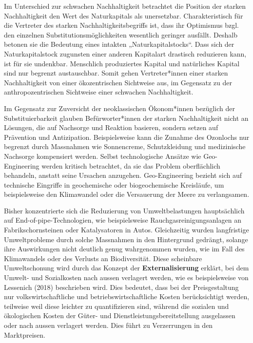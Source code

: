 \documentclass[
  nswissgerman,
  a4paper,
  DIV=11,
  numbers=noendperiod,
  oneside,
  openany]{scrreprt}
\begin{document}
Im Unterschied zur schwachen Nachhaltigkeit betrachtet die Position der
starken Nachhaltigkeit den Wert des Naturkapitals als unersetzbar.
Charakteristisch für die Vertreter des starken Nachhaltigkeitsbegriffs
ist, dass ihr Optimismus bzgl. den einzelnen Substitutionsmöglichkeiten
wesentlich geringer ausfällt. Deshalb betonen sie die Bedeutung eines
intakten „Naturkapitalstocks``. Dass sich der Naturkapitalstock
zugunsten einer anderen Kapitalart drastisch reduzieren kann, ist für
sie undenkbar. Menschlich produziertes Kapital und natürliches Kapital
sind nur begrenzt austauschbar. Somit gehen Vertreter*innen einer
starken Nachhaltigkeit von einer ökozentrischen Sichtweise aus, im
Gegensatz zu der anthropozentrischen Sichtweise einer schwachen
Nachhaltigkeit.

Im Gegensatz zur Zuversicht der neoklassischen Ökonom*innen bezüglich
der Substituierbarkeit glauben Befürworter*innen der starken
Nachhaltigkeit nicht an Lösungen, die auf Nachsorge und Reaktion
basieren, sondern setzen auf Prävention und Antizipation. Beispielsweise
kann die Zunahme des Ozonlochs nur begrenzt durch Massnahmen wie
Sonnencreme, Schutzkleidung und medizinische Nachsorge kompensiert
werden. Selbst technologische Ansätze wie Geo-Engineering werden
kritisch betrachtet, da sie das Problem oberflächlich behandeln, anstatt
seine Ursachen anzugehen. Geo-Engineering bezieht sich auf technische
Eingriffe in geochemische oder biogeochemische Kreisläufe, um
beispielsweise den Klimawandel oder die Versauerung der Meere zu
verlangsamen.

Bisher konzentrierte sich die Reduzierung von Umweltbelastungen
hauptsächlich auf End-of-pipe-Technologien, wie beispielsweise
Rauchgasreinigungsanlagen an Fabrikschornsteinen oder Katalysatoren in
Autos. Gleichzeitig wurden langfristige Umweltprobleme durch solche
Massnahmen in den Hintergrund gedrängt, solange ihre Auswirkungen nicht
deutlich genug wahrgenommen wurden, wie im Fall des Klimawandels oder
des Verlusts an Biodiversität. Diese scheinbare Umweltschonung wird
durch das Konzept der \textbf{Externalisierung} erklärt, bei dem Umwelt-
und Sozialkosten nach aussen verlagert werden, wie es beispielsweise von
Lessenich (2018) beschrieben wird. Dies bedeutet, dass bei der
Preisgestaltung nur volkswirtschaftliche und betriebswirtschaftliche
Kosten berücksichtigt werden, teilweise weil diese leichter zu
quantifizieren sind, während die sozialen und ökologischen Kosten der
Güter- und Dienstleistungsbereitstellung ausgelassen oder nach aussen
verlagert werden. Dies führt zu Verzerrungen in den Marktpreisen.
\end{document}
